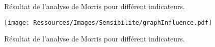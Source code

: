 \begin{figure}
    \begin{center}
    \end{center}
    \caption{Résultat de l’analyse de Morris pour différent indicateurs.
             \label{fig:morris_analysis_indicateurs}}
\end{figure}


\begin{landscape}
    \begin{figure}
      \begin{center}
          \texttt{[image: Ressources/Images/Sensibilite/graphInfluence.pdf]}
      \end{center}
      \caption{Résultat de l’analyse de Morris pour différent indicateurs.
               \label{fig:graphe_influence}}
  \end{figure}
\end{landscape}

